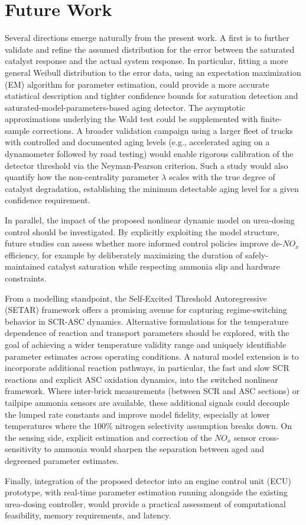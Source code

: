 \section{Future Work}

Several directions emerge naturally from the present work. A first is to
further validate and refine the assumed distribution for the error between the
saturated catalyst response and the actual system response. In particular,
fitting a more general Weibull distribution to the error data, using an
expectation maximization (EM) algorithm for parameter estimation, could provide
a more accurate statistical description and tighter confidence bounds for
saturation detection and saturated-model-parameters-based aging detector. The
asymptotic approximations underlying the Wald test could be supplemented with
finite-sample corrections. A broader validation campaign using a larger fleet
of trucks with controlled and documented aging levels (e.g., accelerated aging
on a dynamometer followed by road testing) would enable rigorous calibration of
the detector threshold via the Neyman-Pearson criterion. Such a study would
also quantify how the non-centrality parameter $\lambda$ scales with the true
degree of catalyst degradation, establishing the minimum detectable aging level
for a given confidence requirement.

In parallel, the impact of the proposed nonlinear dynamic model on urea-dosing
control should be investigated. By explicitly exploiting the model structure,
future studies can assess whether more informed control policies improve
de-$NO_x$ efficiency, for example by deliberately maximizing the duration of
safely-maintained catalyst saturation while respecting ammonia slip and
hardware constraints.

From a modelling standpoint, the Self-Excited Threshold Autoregressive (SETAR)
framework offers a promising avenue for capturing regime-switching behavior in
SCR-ASC dynamics. Alternative formulations for the temperature dependence of
reaction and transport parameters should be explored, with the goal of
achieving a wider temperature validity range and uniquely
identifiable parameter estimates across operating conditions. A natural model
extension is to incorporate additional reaction pathways, in particular, the
fast and slow SCR reactions and explicit ASC oxidation dynamics, into the
switched nonlinear framework. Where inter-brick measurements (between SCR and
ASC sections) or tailpipe ammonia sensors are available, these additional
signals could decouple the lumped rate constants and improve model fidelity,
especially at lower temperatures where the $100\%$ nitrogen selectivity
assumption breaks down. On the sensing side, explicit estimation and correction
of the $NO_x$ sensor cross-sensitivity to ammonia would sharpen the separation
between aged and degreened parameter estimates. 

Finally, integration of the proposed detector into an engine control unit (ECU)
prototype, with real-time parameter estimation running alongside the existing
urea-dosing controller, would provide a practical assessment of computational
feasibility, memory requirements, and latency. 